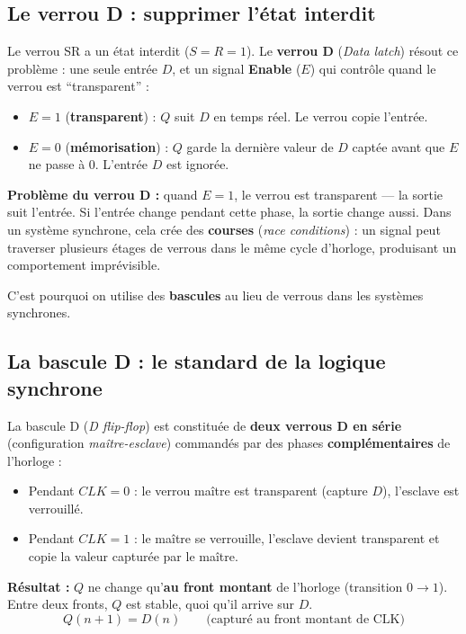 \documentclass[12pt,a4paper,twoside]{book}
\begin{document}
\subsection{Le verrou D : supprimer l'état interdit}

Le verrou SR a un état interdit ($S = R = 1$). Le \textbf{verrou D} (\textit{Data latch}) résout ce problème : une seule entrée $D$, et un signal \textbf{Enable} ($E$) qui contrôle quand le verrou est ``transparent'' :

\begin{formule}
\begin{itemize}[nosep]
\item $E = 1$ (\textbf{transparent}) : $Q$ suit $D$ en temps réel. Le verrou copie l'entrée.
\item $E = 0$ (\textbf{mémorisation}) : $Q$ garde la dernière valeur de $D$ captée avant que $E$ ne passe à 0. L'entrée $D$ est ignorée.
\end{itemize}
\end{formule}

\begin{attention}
\textbf{Problème du verrou D :} quand $E = 1$, le verrou est transparent --- la sortie suit l'entrée. Si l'entrée change pendant cette phase, la sortie change aussi. Dans un système synchrone, cela crée des \textbf{courses} (\textit{race conditions}) : un signal peut traverser plusieurs étages de verrous dans le même cycle d'horloge, produisant un comportement imprévisible.

C'est pourquoi on utilise des \textbf{bascules} au lieu de verrous dans les systèmes synchrones.
\end{attention}

\subsection{La bascule D : le standard de la logique synchrone}

\begin{formule}
La bascule D (\textit{D flip-flop}) est constituée de \textbf{deux verrous D en série} (configuration \textit{maître-esclave}) commandés par des phases \textbf{complémentaires} de l'horloge :

\begin{itemize}[nosep]
\item Pendant $CLK = 0$ : le verrou maître est transparent (capture $D$), l'esclave est verrouillé.
\item Pendant $CLK = 1$ : le maître se verrouille, l'esclave devient transparent et copie la valeur capturée par le maître.
\end{itemize}

\textbf{Résultat :} $Q$ ne change qu'\textbf{au front montant} de l'horloge (transition $0 \to 1$). Entre deux fronts, $Q$ est stable, quoi qu'il arrive sur $D$.
\[
\boxed{Q(n+1) = D(n)} \qquad \text{(capturé au front montant de CLK)}
\]
\end{formule}
\end{document}
